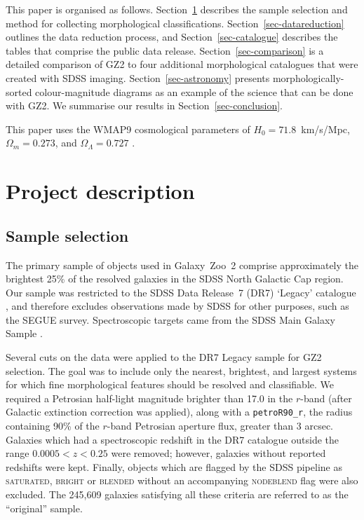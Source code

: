\documentclass[useAMS,usenatbib]{mn2e}
\begin{document}
This paper is organised as follows. Section~\ref{sec-description} describes the sample selection and method for collecting morphological classifications. Section~\ref{sec-datareduction} outlines the data reduction process, and Section~\ref{sec-catalogue} describes the tables that comprise the public data release. Section~\ref{sec-comparison} is a detailed comparison of GZ2 to four additional morphological catalogues that were created with SDSS imaging. Section~\ref{sec-astronomy} presents morphologically-sorted colour-magnitude diagrams as an example of the science that can be done with GZ2. We summarise our results in Section~\ref{sec-conclusion}. 

This paper uses the WMAP9 cosmological parameters of $H_0=71.8$~km/s/Mpc, $\Omega_m = 0.273$, and $\Omega_\Lambda = 0.727$ \citep{hin12}. 


\section{Project description} \label{sec-description}

\subsection{Sample selection} \label{ssec-sample}
The primary sample of objects used in Galaxy~Zoo~2 comprise approximately the brightest 25\% of the resolved galaxies in the SDSS North Galactic Cap region. Our sample was restricted to the SDSS Data Release~7 (DR7) `Legacy' catalogue \citep{aba09}, and therefore excludes observations made by SDSS for other purposes, such as the SEGUE survey. Spectroscopic targets came from the SDSS Main Galaxy Sample \citep{str02}.

Several cuts on the data were applied to the DR7 Legacy sample for GZ2 selection. The goal was to include only the nearest, brightest, and largest systems for which fine morphological features should be resolved and classifiable. We required a Petrosian half-light magnitude brighter than 17.0 in the $r$-band (after Galactic extinction correction was applied), along with a {\tt petroR90\_r}, the radius containing 90\% of the $r$-band Petrosian aperture flux, greater than 3 arcsec. Galaxies which had a spectroscopic redshift in the DR7 catalogue outside the range $0.0005<z<0.25$ were removed; however, galaxies without reported redshifts were kept. Finally, objects which are flagged by the SDSS pipeline as \textsc{saturated}, \textsc{bright} or \textsc{blended} without an accompanying \textsc{nodeblend} flag were also excluded. The 245,609 galaxies satisfying all these criteria are referred to as the ``original'' sample.  
\end{document}
